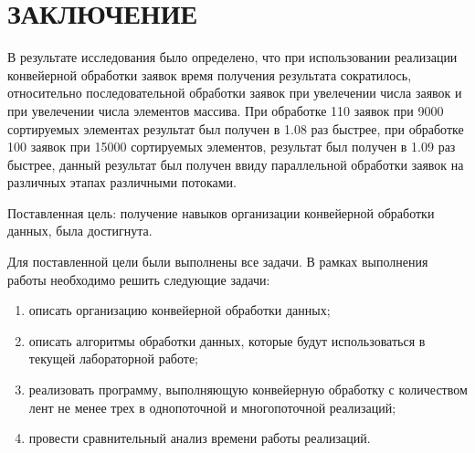 \chapter*{\hfill{\centering  ЗАКЛЮЧЕНИЕ}\hfill}

В результате исследования было определено, что при использовании реализации конвейерной обработки заявок время получения результата сократилось, относительно последовательной обработки заявок при увелечении числа заявок и при увелечении числа элементов массива. При обработке 110 заявок при 9000 сортируемых элементах результат был получен в 1.08 раз быстрее, при обработке 100 заявок при 15000 сортируемых элементов, результат был получен в 1.09 раз быстрее, данный результат был получен ввиду параллельной обработки заявок на различных этапах различными потоками.





Поставленная цель: получение навыков организации конвейерной обработки данных, была достигнута.

Для поставленной цели были выполнены все задачи.
В рамках выполнения работы необходимо решить следующие задачи: 
\begin{enumerate}
	\item описать организацию конвейерной обработки данных;
	\item описать алгоритмы обработки данных, которые будут использоваться в текущей лабораторной работе;
	\item реализовать программу, выполняющую конвейерную обработку с количеством лент не менее трех в однопоточной и многопоточной реализаций;
	\item провести сравнительный анализ времени работы реализаций.
\end{enumerate}

